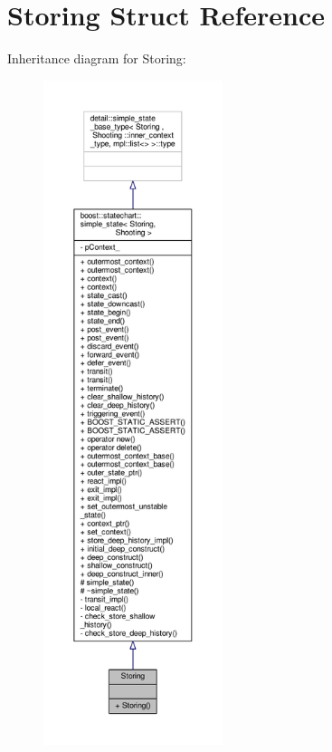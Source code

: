 \hypertarget{struct_storing}{}\section{Storing Struct Reference}
\label{struct_storing}


Inheritance diagram for Storing\+:
\nopagebreak
\begin{figure}[H]
\begin{center}
\leavevmode
\includegraphics[height=550pt]{struct_storing__inherit__graph}
\end{center}
\end{figure}


